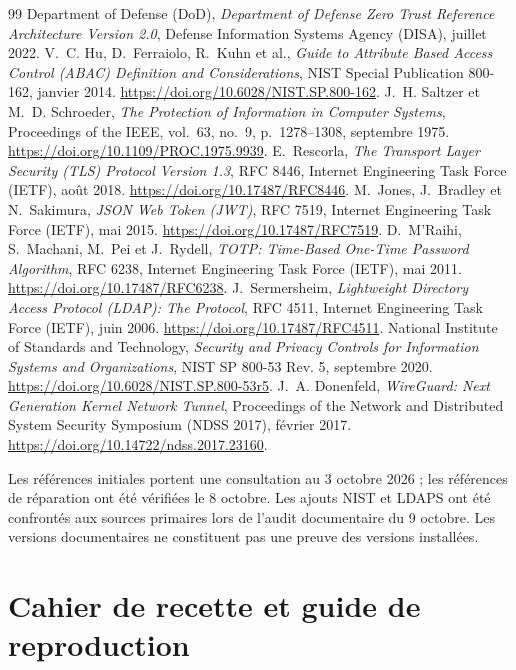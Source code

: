 \documentclass[a4paper,12pt]{report}
\begin{document}
\begin{thebibliography}{99}
 Department of Defense (DoD), \textit{Department of Defense Zero Trust Reference Architecture Version 2.0}, Defense Information Systems Agency (DISA), juillet 2022.
 V.~C. Hu, D.~Ferraiolo, R.~Kuhn et al., \textit{Guide to Attribute Based Access Control (ABAC) Definition and Considerations}, NIST Special Publication 800-162, janvier 2014. \url{https://doi.org/10.6028/NIST.SP.800-162}.
 J.~H. Saltzer et M.~D. Schroeder, \textit{The Protection of Information in Computer Systems}, Proceedings of the IEEE, vol.~63, no.~9, p.~1278--1308, septembre 1975. \url{https://doi.org/10.1109/PROC.1975.9939}.
 E.~Rescorla, \textit{The Transport Layer Security (TLS) Protocol Version 1.3}, RFC 8446, Internet Engineering Task Force (IETF), août 2018. \url{https://doi.org/10.17487/RFC8446}.
 M.~Jones, J.~Bradley et N.~Sakimura, \textit{JSON Web Token (JWT)}, RFC 7519, Internet Engineering Task Force (IETF), mai 2015. \url{https://doi.org/10.17487/RFC7519}.
 D.~M'Raihi, S.~Machani, M.~Pei et J.~Rydell, \textit{TOTP: Time-Based One-Time Password Algorithm}, RFC 6238, Internet Engineering Task Force (IETF), mai 2011. \url{https://doi.org/10.17487/RFC6238}.
 J.~Sermersheim, \textit{Lightweight Directory Access Protocol (LDAP): The Protocol}, RFC 4511, Internet Engineering Task Force (IETF), juin 2006. \url{https://doi.org/10.17487/RFC4511}.
 National Institute of Standards and Technology, \textit{Security and Privacy Controls for Information Systems and Organizations}, NIST SP 800-53 Rev. 5, septembre 2020. \url{https://doi.org/10.6028/NIST.SP.800-53r5}.
 J.~A. Donenfeld, \textit{WireGuard: Next Generation Kernel Network Tunnel}, Proceedings of the Network and Distributed System Security Symposium (NDSS 2017), février 2017. \url{https://doi.org/10.14722/ndss.2017.23160}.
\end{thebibliography}
\noindent\small Les références initiales portent une consultation au 3 octobre 2026 ; les références de réparation ont été vérifiées le 8 octobre. Les ajouts NIST et LDAPS ont été confrontés aux sources primaires lors de l'audit documentaire du 9 octobre. Les versions documentaires ne constituent pas une preuve des versions installées.\normalsize

\appendix
\chapter{Cahier de recette et guide de reproduction}
\label{annexe:reproduction}
\end{document}
